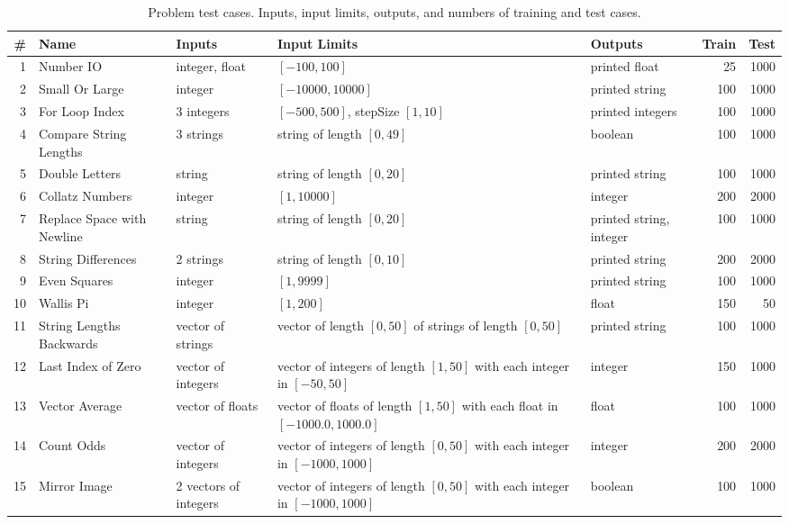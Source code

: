 \documentclass{sig-alternate}
\begin{document}
\begin{table*}[t]
\centering
\caption{Problem test cases. Inputs, input limits, outputs, and numbers of training and test cases.}
\begin{tabular}{|r >{\raggedright}p{2.6cm} | >{\raggedright}p{2cm} >{\raggedright}p{5.5cm} >{\raggedright}p{2.5cm} rr|}
\hline
\# & Name & Inputs & Input Limits & Outputs & Train & Test \\
\hline
\hline
1 & Number IO & integer, float & $[-100, 100]$ & printed float & 25 & 1000 \\
\hline
2 & Small Or Large & integer & $[-10000, 10000]$ & printed string & 100 & 1000 \\
\hline
3 & For Loop Index & 3 integers & $[-500, 500]$, stepSize $[1, 10]$ & printed integers & 100 & 1000 \\
\hline
4 & Compare String Lengths & 3 strings & string of length $[0, 49]$ & boolean & 100 & 1000 \\
\hline
5 & Double Letters & string & string of length $[0, 20]$ & printed string & 100 & 1000 \\
\hline
6 & Collatz Numbers & integer & $[1, 10000]$ & integer & 200 & 2000 \\
\hline
7 & Replace Space with Newline & string & string of length $[0, 20]$ & printed string, integer & 100 & 1000 \\
\hline
8 & String Differences & 2 strings & string of length $[0, 10]$ & printed string & 200 & 2000 \\
\hline
9 & Even Squares & integer & $[1, 9999]$ & printed string & 100 & 1000 \\
\hline
10 & Wallis Pi & integer & $[1, 200]$ & float & 150 & 50 \\
\hline
11 & String Lengths Backwards & vector of strings & vector of length $[0, 50]$ of strings of length $[0, 50]$ & printed string & 100 & 1000 \\
\hline
12 & Last Index of Zero & vector of integers & vector of integers of length $[1, 50]$ with each integer in $[-50, 50]$ & integer & 150 & 1000 \\
\hline
13 & Vector Average & vector of floats & vector of floats of length $[1,50]$ with each float in $[-1000.0, 1000.0]$ & float & 100 & 1000 \\
\hline
14 & Count Odds & vector of integers & vector of integers of length $[0,50]$ with each integer in $[-1000, 1000]$ & integer & 200 & 2000 \\
\hline
15 & Mirror Image & 2 vectors of integers & vector of integers of length $[0,50]$ with each integer in $[-1000, 1000]$ & boolean & 100 & 1000 \\

\end{tabular}
\end{table*}
\end{document}
